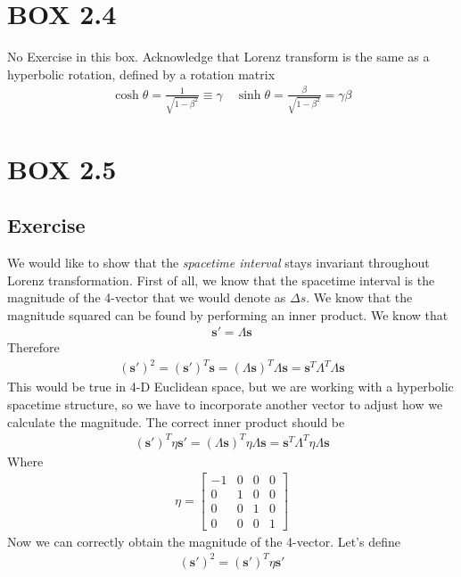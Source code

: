 \documentclass[12pt]{memoir}
\newcommand{\paren}[1]{\left( #1 \right)}
\begin{document}
\section{BOX 2.4}
No Exercise in this box. Acknowledge that Lorenz transform is the same as a hyperbolic rotation, defined by a rotation matrix
\begin{align}
\cosh\theta = \frac{1}{\sqrt{1-\beta^2}} \equiv \gamma \quad \sinh\theta = \frac{\beta}{\sqrt{1-\beta^2}}=\gamma \beta
\end{align}

\section{BOX 2.5}
\subsection{Exercise}
We would like to show that the \textit{spacetime interval} stays invariant throughout Lorenz transformation. First of all, we know that the spacetime interval is the magnitude of the 4-vector that we would denote as $\Delta s$. We know that the magnitude squared can be found by performing an inner product. We know that
\begin{align}
\mathbf{s'} = \Lambda\mathbf{s}
\end{align}
Therefore
\begin{align}
(\mathbf{s}')^2 = \paren{\mathbf{s}'}^T\mathbf{s} = \paren{\Lambda\mathbf{s}}^T\Lambda\mathbf{s} = \mathbf{s}^T\Lambda^T\Lambda\mathbf{s}
\end{align}
This would be true in 4-D Euclidean space, but we are working with a hyperbolic spacetime structure, so we have to incorporate another vector to adjust how we calculate the magnitude. The correct inner product should be
\begin{align}
\paren{\mathbf{s}'}^T\eta\mathbf{s}' = \paren{\Lambda\mathbf{s}}^T\eta \Lambda\mathbf{s} = \mathbf{s}^T\Lambda^T\eta \Lambda\mathbf{s}
\end{align}
Where 
\begin{align}
\eta = \begin{bmatrix}
    -1&0&0&0\\
    0&1&0&0\\
    0&0&1&0\\
    0&0&0&1
\end{bmatrix}
\end{align}
Now we can correctly obtain the magnitude of the 4-vector. Let's define
\begin{align}
\paren{\mathbf{s}'}^2 = \paren{\mathbf{s}'}^T\eta\mathbf{s}'
\end{align}
\end{document}
